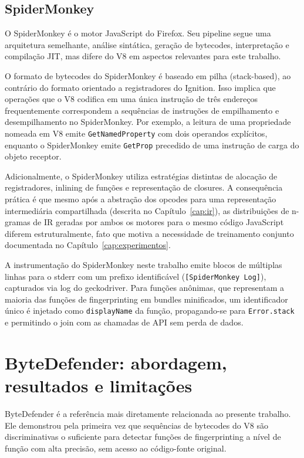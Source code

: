 \subsection{SpiderMonkey}
\label{sub:spidermonkey}

O SpiderMonkey é o motor JavaScript do Firefox. Seu pipeline segue uma arquitetura
semelhante, análise sintática, geração de bytecodes, interpretação e compilação
JIT, mas difere do V8 em aspectos relevantes para este trabalho.

O formato de bytecodes do SpiderMonkey é baseado em pilha (stack-based), ao
contrário do formato orientado a registradores do Ignition. Isso implica que
operações que o V8 codifica em uma única instrução de três endereços frequentemente
correspondem a sequências de instruções de empilhamento e desempilhamento no
SpiderMonkey. Por exemplo, a leitura de uma propriedade nomeada em V8 emite
\texttt{GetNamedProperty} com dois operandos explícitos, enquanto o SpiderMonkey
emite \texttt{GetProp} precedido de uma instrução de carga do objeto receptor.

Adicionalmente, o SpiderMonkey utiliza estratégias distintas de alocação de
registradores, inlining de funções e representação de closures. A consequência
prática é que mesmo após a abstração dos opcodes para uma representação
intermediária compartilhada (descrita no Capítulo~\ref{cap:ir}), as distribuições
de n-gramas de IR geradas por ambos os motores para o mesmo código JavaScript
diferem estruturalmente, fato que motiva a necessidade de treinamento conjunto
documentada no Capítulo~\ref{cap:experimentos}.

A instrumentação do SpiderMonkey neste trabalho emite blocos de múltiplas linhas
para o stderr com um prefixo identificável (\texttt{[SpiderMonkey Log]}),
capturados via log do geckodriver. Para funções anônimas, que representam a
maioria das funções de fingerprinting em bundles minificados, um identificador único é injetado como \texttt{displayName} da função,
propagando-se para \texttt{Error.stack} e permitindo o join com as chamadas
de API sem perda de dados.

\section{ByteDefender: abordagem, resultados e limitações}
\label{sec:bytedefender}

ByteDefender \cite{nikkhahbahrami2025} é a referência mais diretamente relacionada
ao presente trabalho. Ele demonstrou pela primeira vez que sequências de bytecodes do
V8 são discriminativas o suficiente para detectar funções de fingerprinting
a nível de função com alta precisão, sem acesso ao código-fonte original.

